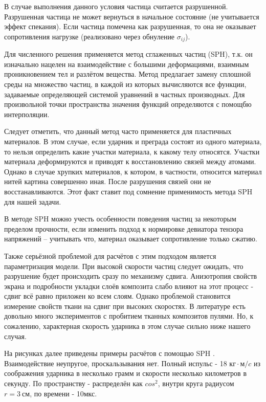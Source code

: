 В случае выполнения данного условия частица считается разрушенной.
Разрушенная частица не может вернуться в начальное состояние (не учитывается эффект спекания).
Если частица помечена как разрушенная, то она не оказывает сопротивления нагрузке (реализовано через обнуление $\sigma_{i j}$).

Для численного решения применяется метод сглаженных частиц (SPH)\cite{monaghanSPH}, т.к. он изначально нацелен на взаимодействие
с большими деформациями, взаимным проникновением тел и разлётом вещества.
Метод предлагает замену сплошной среды на множество частиц, в каждой из которых вычисляются все функции, задаваемые
определяющей системой уравнений в частных производных.
Для произвольной точки пространства значения функций определяются с помощбю интерполяции.

Следует отметить, что данный метод часто применяется для пластичных материалов.
В этом случае, если ударник и преграда состоят из одного материала, то нельзя определить какие участки материала,
к какому телу относятся.
Участки материала деформируются и приводят к восстановлению связей между атомами.
Однако в случае хрупких материалов, к котором, в частности, относится материал нитей картина совершенно иная.
После разрушения связей они не восстанавливаются.
Этот факт ставит под сомнение применимость метода SPH для нашей задачи\cite{bkhatnagar}.

В методе SPH можно учесть особенности поведения частиц за некоторым пределом прочности, если изменить подход
к нормировке девиатора тензора напряжений -- учитывать что, материал оказывает сопротивление только сжатию.

Также серьёзной проблемой для расчётов с этим подходом является параметризация модели.
При высокой скорости частиц следует ожидать, что разрушение будет происходить сразу по механизму сдвига.
Анизотропия свойств экрана и подробности укладки слоёв композита слабо влияют на этот процесс - сдвиг всё равно
приложен ко всем слоям.
Однако проблемой становится измерение свойств ткани на сдвиг при высоких скоростях.
В литературе есть довольно много экспериментов с пробитием тканных композитов пулями.
Но, к сожалению, характерная скорость ударника в этом случае сильно ниже нашего случая.

На рисунках далее приведены примеры расчётов с помощью SPH .
Взаимодействие неупругое, проскальзывания нет.
Полный испульс - 18 $кг \cdot м / c$ из соображения ударника в несколько грамм и скорости несколько километров в секунду.
По пространству - распределён как $cos^2$, внутри круга радиусом $r = 3~см$, по времени - 10мкс.

